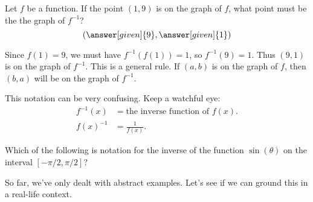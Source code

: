 \documentclass{ximera}
\begin{document}
\begin{question}
  Let $f$ be a function.  If the point $(1,9)$ is on the graph of $f$,
  what point must be the the graph of $f^{-1}$?	
  \[
  \left( \answer[given]{9}, \answer[given]{1} \right)
  \]
  \begin{feedback}
    Since $f(1) = 9$, we must have $f^{-1}(f(1)) = 1$, so $f^{-1}(9) =
    1$.  Thus $(9,1)$ is on the graph of $f^{-1}$.  This is a general
    rule.  If $(a,b)$ is on the graph of $f$, then $(b,a)$ will be on the
    graph of $f^{-1}$.
  \end{feedback}
\end{question}

\begin{warning}
  This notation can be very confusing.  Keep a watchful eye:
  \begin{align*}
    f^{-1}(x) &= \text{the inverse function of $f(x)$.}\\
    f(x)^{-1} &= \text{$\frac{1}{f(x)}$.}
  \end{align*}
\end{warning}
\begin{question}
  Which of the following is notation for the inverse of the function
  $\sin(\theta)$ on the interval $[-\pi/2,\pi/2]$?
  \begin{multipleChoice}
  \end{multipleChoice}
\end{question}


So far, we've only dealt with abstract examples.  Let's see
if we can ground this in a real-life context.
\end{document}
